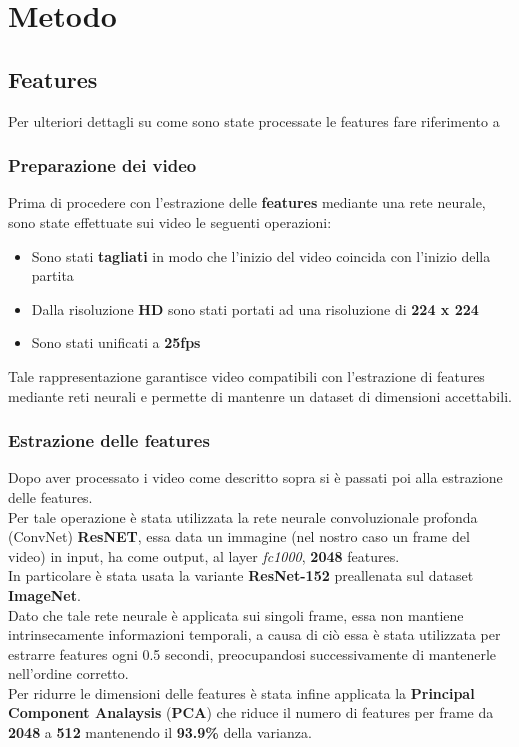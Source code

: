 \chapter{Metodo}\label{ch:chapter1}
\section{Features}
Per ulteriori dettagli su come sono state processate le features fare riferimento a \citep{soccerNet}
\subsection{Preparazione dei video }
Prima di procedere con l'estrazione delle \textbf{features} mediante una rete neurale, sono state effettuate sui video le seguenti operazioni:
\begin{itemize}
\item Sono stati \textbf{tagliati} in modo che l'inizio del video coincida con l'inizio della partita
\item Dalla risoluzione \textbf{HD} sono stati portati ad una risoluzione di \textbf{224 x 224}
\item Sono stati unificati a \textbf{25fps}
\end{itemize}
Tale rappresentazione garantisce video compatibili con l'estrazione di features mediante reti neurali e permette di mantenre un dataset di dimensioni accettabili.
\subsection{Estrazione delle features}
Dopo aver processato i video come descritto sopra si è passati poi alla estrazione delle features.
\\Per tale operazione è stata utilizzata la rete neurale convoluzionale profonda (ConvNet) \textbf{ResNET}, essa data un immagine (nel nostro caso un frame del video) in input, ha come output, al layer \textit{fc1000}, \textbf{2048} features.
\\In particolare è stata usata la variante \textbf{ResNet-152} preallenata sul dataset \textbf{ImageNet}.
\\Dato che tale rete neurale è applicata sui singoli frame, essa non mantiene intrinsecamente informazioni temporali, a causa di ciò essa è stata utilizzata per estrarre features ogni 0.5 secondi, preocupandosi successivamente di mantenerle nell'ordine corretto.
\\Per ridurre le dimensioni delle features è stata infine applicata la \textbf{Principal Component Analaysis} (\textbf{PCA}) che riduce il numero di features per frame da \textbf{2048} a \textbf{512} mantenendo il \textbf{93.9\%} della varianza.

